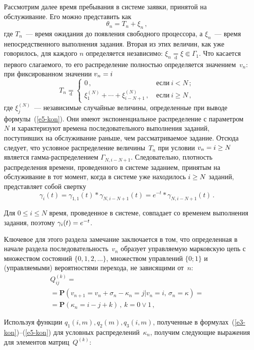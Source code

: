 \begin{multicols}{2}
  Рассмотрим далее время пребывания в системе заявки, принятой на обслуживание. Его 
можно представить как
  $$
  \theta_n=T_n+\xi_n\,,
  $$
где $T_n$~--- время ожидания до появления свободного процессора, а $\xi_n$~--- время 
непосредственного выполнения задания. Вторая из этих величин, как уже говорилось, для 
каждого $n$ определяется независимо: $\xi_n\underset{\mathrm{d}}{=} \xi\Subset \Gamma_1$. Что касается 
первого слагаемого, то его распределение полностью определяется значением~$v_n$: при 
фиксированном значении $v_n\hm=i$
$$
T_n\underset{\mathrm{d}}{=} \begin{cases}
0\,, & \ \mbox{если}\ i<N\,;\\
\xi_1^{(N)}+\cdots+ \xi_{i-N+1}^{(N)}\,, &\ \mbox{если}\ i\geq N\,,
\end{cases}
$$
где $\xi_j^{(N)}$~--- независимые случайные величины, определенные при выводе 
формулы~(\ref{e5-kon}). Они имеют экспоненциальное распределение с параметром~$N$ 
и характеризуют времена последовательного выполнения заданий, поступивших на 
обслуживание раньше, чем рассматриваемое задание. Отсюда следует, что условное 
распределение величины~$T_n$ при условии $v_n\hm=i\hm\geq N$ является 
гам\-ма-рас\-пре\-де\-ле\-ни\-ем $\Gamma_{N,i-N+1}$. Следовательно, плотность 
распределения времени, проведенного в системе заданием, принятым на обслуживание в 
тот момент, когда в системе уже находилось $i\hm\geq N$ заданий, пред\-став\-ля\-ет собой 
свертку
$$
\gamma_i(t) =\gamma_{1,1}(t) * \gamma_{N,i-N+1}(t)=e^{-t}* \gamma_{N,i-N+1} 
(t)\,.
$$
  
  Для $0\leq i\leq N$ время, проведенное в системе, совпадает со временем выполнения 
задания, поэтому $\gamma_i(t)\hm= e^{-t}$.
  
  Ключевое для этого раздела замечание заключается в том, что определенная в начале 
раздела последовательность~$v_n$ образует управляемую марковскую цепь с множеством 
состояний $\{0,1,2,\ldots\}$, множеством управлений $\{0;1\}$ и (управляемыми) 
вероятностями перехода, не зависящими от~$n$:
 \begin{multline*}
  Q_{ij}^{(k)} ={}\\
  {}=\mathbf{P}\left(v_{n+1}=v_n+\sigma_n -\kappa_n=j\vert v_n =i,\, 
\sigma_n=\kappa \right) ={}\\
{}= \mathbf{P} \left( \kappa_n=i-j+k\right)\,,\ k=0\vee 1\,,
  \end{multline*}
  
  Используя функции $q_1(i,m), q_2(m), q_3(i,m)$, полученные в 
  формулах~(\ref{e3-kon})--(\ref{e5-kon}) для условных распределений~$\kappa_n$, 
получим следующие выражения для элементов матриц~$Q^{(k)}$:


\end{multicols}

